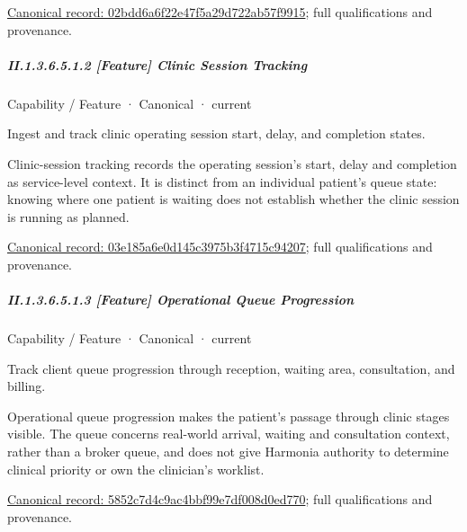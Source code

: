 {\footnotesize \href{../../../../../../../continuum/strategy/capability/feature/02bdd6a6f22e47f5a29d722ab57f9915.md}{Canonical record: 02bdd6a6f22e47f5a29d722ab57f9915}; full qualifications and provenance.}\par
\subparagraph*{II.1.3.6.5.1.2 [Feature] Clinic Session Tracking}
\label{navigation:II.1.3.6.5.1.2}

\label{element:03e185a6e0d145c3975b3f4715c94207}
{\small Capability / Feature · Canonical · current}\par

Ingest and track clinic operating session start, delay, and completion states.



Clinic-session tracking records the operating session's start, delay and completion as service-level context. It is distinct from an individual patient's queue state: knowing where one patient is waiting does not establish whether the clinic session is running as planned.


{\footnotesize \href{../../../../../../../continuum/strategy/capability/feature/03e185a6e0d145c3975b3f4715c94207.md}{Canonical record: 03e185a6e0d145c3975b3f4715c94207}; full qualifications and provenance.}\par
\subparagraph*{II.1.3.6.5.1.3 [Feature] Operational Queue Progression}
\label{navigation:II.1.3.6.5.1.3}

\label{element:5852c7d4c9ac4bbf99e7df008d0ed770}
{\small Capability / Feature · Canonical · current}\par

Track client queue progression through reception, waiting area, consultation, and billing.



Operational queue progression makes the patient's passage through clinic stages visible. The queue concerns real-world arrival, waiting and consultation context, rather than a broker queue, and does not give Harmonia authority to determine clinical priority or own the clinician's worklist.


{\footnotesize \href{../../../../../../../continuum/strategy/capability/feature/5852c7d4c9ac4bbf99e7df008d0ed770.md}{Canonical record: 5852c7d4c9ac4bbf99e7df008d0ed770}; full qualifications and provenance.}\par
